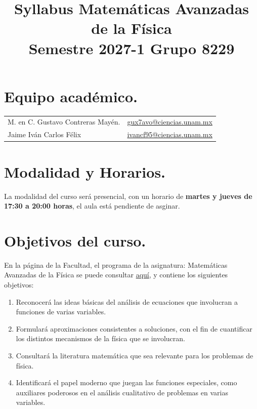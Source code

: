 \documentclass[12pt]{article}
\title{Syllabus Matemáticas Avanzadas de la Física \\ \large{Semestre 2027-1 \hspace{3cm} Grupo 8229}\vspace{-3ex}}
\author{}
\date{ }
\numberwithin{equation}{section}
\begin{document}
\maketitle
\vspace{-2.5cm}

\section{Equipo académico.}

\begin{table}[H]
\renewcommand{\arraystretch}{1.2}
\begin{tabular}{l l}
M. en C. Gustavo Contreras Mayén. & \href{mailto:gux7avo@ciencias.unam.mx}{gux7avo@ciencias.unam.mx} \\
Jaime Iván Carlos Félix  & \href{mailto:ivancf95@ciencias.unam.mx}{ivancf95@ciencias.unam.mx}
\end{tabular}
\end{table}

\section{Modalidad y Horarios.}

La modalidad del curso será presencial, con un horario de \textbf{martes y jueves de 17:30 a 20:00 horas}, el aula está pendiente de asginar.

\section{Objetivos del curso.}

En la página de la Facultad, el programa de la asignatura: Matemáticas Avanzadas de la Física se puede consultar 
\href{https://www.fciencias.unam.mx/sites/default/files/temario/610.pdf}{aquí}, y contiene los siguientes objetivos:
\begin{enumerate}
\item Reconocerá las ideas básicas del análisis de ecuaciones que involucran a funciones de varias variables.
\item Formulará aproximaciones consistentes a soluciones, con el fin de cuantificar los distintos mecanismos de la física que se involucran.
\item Consultará la literatura matemática que sea relevante para los problemas de física.
\item Identificará el papel moderno que juegan las funciones especiales, como auxiliares poderosos en el análisis cualitativo de problemas en varias variables.
\end{enumerate}
\end{document}
